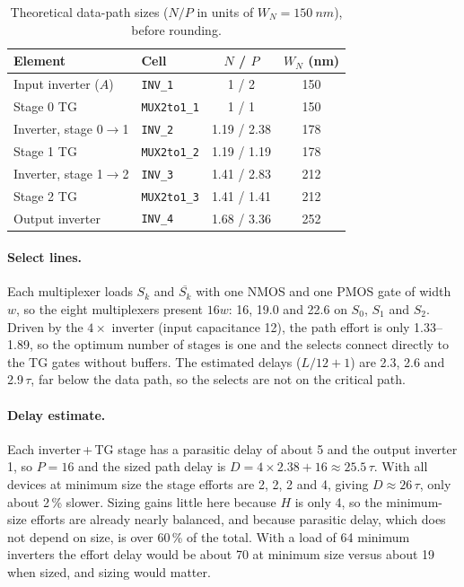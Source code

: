 \documentclass[11pt]{article}
\begin{document}
\begin{table}[H]
\centering
\caption{Theoretical data-path sizes ($N/P$ in units of $W_N=\SI{150}{nm}$),
before rounding.}
\label{tab:sizing}
\begin{tabular}{llcc}
\toprule
Element & Cell & $N$ / $P$ & $W_N$ (nm) \\
\midrule
Input inverter ($A$)        & \texttt{INV\_1}     & 1 / 2         & 150 \\
Stage 0 TG                  & \texttt{MUX2to1\_1} & 1 / 1         & 150 \\
Inverter, stage 0$\to$1     & \texttt{INV\_2}     & 1.19 / 2.38   & 178 \\
Stage 1 TG                  & \texttt{MUX2to1\_2} & 1.19 / 1.19   & 178 \\
Inverter, stage 1$\to$2     & \texttt{INV\_3}     & 1.41 / 2.83   & 212 \\
Stage 2 TG                  & \texttt{MUX2to1\_3} & 1.41 / 1.41   & 212 \\
Output inverter             & \texttt{INV\_4}     & 1.68 / 3.36   & 252 \\
\bottomrule
\end{tabular}
\end{table}

\paragraph{Select lines.} Each multiplexer loads $S_k$ and
$\overline{S_k}$ with one NMOS and one PMOS gate of width $w$, so the eight
multiplexers present $16w$: 16, 19.0 and 22.6 on $S_0$, $S_1$ and $S_2$.
Driven by the $4\times$ inverter (input capacitance 12), the path effort is
only 1.33--1.89, so the optimum number of stages is one and the selects
connect directly to the TG gates without buffers. The estimated delays
($L/12 + 1$) are 2.3, 2.6 and 2.9\,$\tau$, far below the data path, so the
selects are not on the critical path.

\paragraph{Delay estimate.} Each inverter\,+\,TG stage has a parasitic delay
of about 5 and the output inverter 1, so $P = 16$ and the sized path delay
is $D = 4 \times 2.38 + 16 \approx 25.5\,\tau$. With all devices at minimum
size the stage efforts are 2, 2, 2 and 4, giving $D \approx 26\,\tau$, only
about 2\,\% slower. Sizing gains little here because $H$ is only 4, so the
minimum-size efforts are already nearly balanced, and because parasitic
delay, which does not depend on size, is over 60\,\% of the total. With a
load of 64 minimum inverters the effort delay would be about 70 at minimum
size versus about 19 when sized, and sizing would matter.
\end{document}
